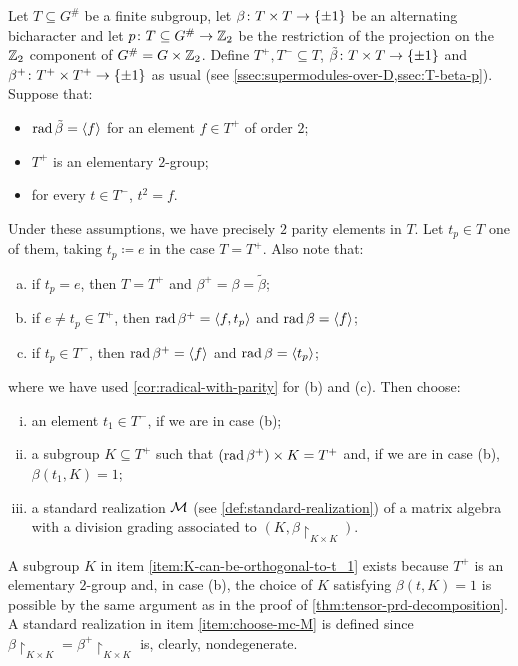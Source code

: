 \begin{defi}\label{def:std-realization-MxM-QxQ}
    Let $T \subseteq G^\#$ be a finite subgroup, let $\beta\colon T\times T \to \{ \pm 1 \}$ be an alternating bicharacter and let $p\colon T \subseteq G^\# \to \mathbb{Z}_2$ be the restriction of the projection on the $\mathbb{Z}_2$ component of $G^\# = G \times \mathbb{Z}_2$. 
    Define $T^+, T^- \subseteq T$, $\tilde\beta\colon T\times T \to \{ \pm 1 \}$ and $\beta^+\colon T^+\times T^+ \to \{ \pm 1 \}$ as usual (see \cref{ssec:supermodules-over-D,ssec:T-beta-p}).
    Suppose that:
    \begin{itemize}
        \item $\operatorname{rad} \tilde \beta = \langle f \rangle$ for an element $f\in T^+$ of order $2$;
        \item $T^+$ is an elementary $2$-group;
        \item for every $t\in T^-$, $t^2 = f$.
    \end{itemize}
    Under these assumptions, we have precisely $2$ parity elements in $T$. 
    Let $t_p \in T$ one of them, taking $t_p \coloneqq e$ in the case $T = T^+$. 
    Also note that:
    \begin{enumerate}[(a)]
        \item if $t_p =e$, then $T = T^+$ and $\beta^+ = \beta = \tilde\beta$;
        \item if $e \neq t_p \in T^+$, then $\operatorname{rad} \beta^+ = \langle f, t_p \rangle$ and $\operatorname{rad} \beta = \langle f \rangle$;
        \item if $t_p \in T^-$, then $\operatorname{rad} \beta^+ = \langle f \rangle$ and $\operatorname{rad} \beta = \langle t_p \rangle$;
    \end{enumerate}
    where we have used \cref{cor:radical-with-parity} for (b) and (c).
    Then choose:
    \begin{enumerate}[(i)]
        \item an element $t_1 \in T^-$, if we are in case (b);
        \label{item:choose-t_1-std-realization}
        \item a subgroup $K \subseteq T^+$ such that $(\operatorname{rad} \beta^+) \times K = T^+$ and, if we are in case (b), $\beta(t_1, K) = 1$;
        \label{item:K-can-be-orthogonal-to-t_1}
        \item a standard realization $\mathcal M$ (see     \cref{def:standard-realization}) of a matrix algebra with a division grading  associated to $(K, \beta\restriction_{K\times K})$. 
        \label{item:choose-mc-M}
    \end{enumerate}
    A subgroup $K$ in item \eqref{item:K-can-be-orthogonal-to-t_1} exists because $T^+$ is an elementary $2$-group and, in case (b), the choice of $K$ satisfying $\beta(t, K) = 1$ is possible by the same argument as in the proof of \cref{thm:tensor-prd-decomposition}. 
    A standard realization in item \eqref{item:choose-mc-M} is defined since $\beta\restriction_{K\times K} = \beta^+\restriction_{K\times K}$ is, clearly, nondegenerate. 
    

\end{defi}

